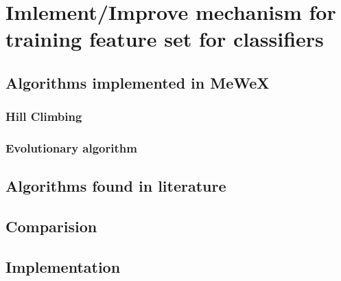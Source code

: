 \chapter{Imlement/Improve mechanism for training feature set for classifiers}

\section{Algorithms implemented in MeWeX}

\subsection{Hill Climbing}

\subsection{Evolutionary algorithm}

\section{Algorithms found in literature}

\section{Comparision}

\section{Implementation}